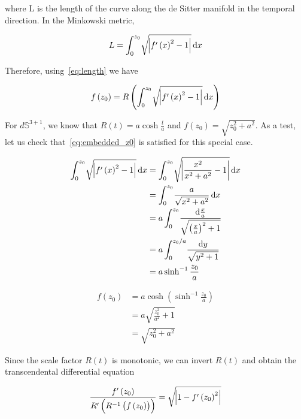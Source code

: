 \documentclass[preprint,notitlepage,amsmath,amssymb,floatfix]{revtex4-1}
\begin{document}
\noindent where L is the length of the curve along the de Sitter manifold in the temporal direction.  In the Minkowski metric,

\begin{equation}
L = \int_0^{z_0}\!\sqrt{\abs{f^\prime\left(x\right)^2 - 1}}\,\mathrm dx
\end{equation}

Therefore, using~\eqref{eq:length} we have

\begin{equation}
\label{eq:embedded_z0}
f\left(z_0\right) = R\left(\int_0^{z_0}\!\sqrt{\abs{f^\prime\left(x\right)^2-1}}\,\mathrm dx\right)
\end{equation}

For $d\mathbb{S}^{3+1}$, we know that $R\left(t\right) = a\cosh\frac{t}{a}$ and $f\left(z_0\right) = \sqrt{z_0^2+a^2}$.  As a test, let us check that~\eqref{eq:embedded_z0} is satisfied for this special case.

\begin{equation}
\begin{split}
\int_0^{z_0}\!\sqrt{\abs{f^\prime\left(x\right)^2-1}}\,\mathrm dx &= \int_0^{z_0}\!\sqrt{\abs{\frac{x^2}{x^2+a^2}-1}}\,\mathrm dx \\
&= \int_0^{z_0}\!\frac{a}{\sqrt{x^2+a^2}}\,\mathrm dx \\
&= a\int_0^{z_0}\!\frac{\mathrm d\frac{x}{a}}{\sqrt{\left(\frac{x}{a}\right)^2+1}} \\
&= a\int_0^{z_0/a}\!\frac{\mathrm dy}{\sqrt{y^2+1}} \\
&= a\sinh^{-1}\frac{z_0}{a}
\end{split}
\end{equation}

\begin{equation}
\begin{split}
f\left(z_0\right) &= a\cosh\left(\sinh^{-1}\frac{z_0}{a}\right) \\
&= a\sqrt{\frac{z_0^2}{a^2}+1} \\
&= \sqrt{z_0^2+a^2}
\end{split}
\end{equation}

\noindent Since the scale factor $R\left(t\right)$ is monotonic, we can invert $R\left(t\right)$ and obtain the transcendental differential equation

\begin{equation}
\frac{f^\prime\left(z_0\right)}{R^\prime\left(R^{-1}\left(f\left(z_0\right)\right)\right)} = \sqrt{\abs{1 - f^\prime\left(z_0\right)^2}}
\end{equation}
\end{document}
